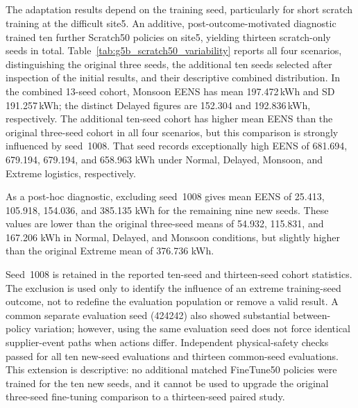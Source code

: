 \subsection[Transfer Variability and Scalability Limitations]
{}
\label{sec:g5b_scalability_limits}
\begin{revisedblock}
The adaptation results depend on the training seed, particularly for
short scratch training at the difficult site5. An additive,
post-outcome-motivated diagnostic trained ten further Scratch50
policies on site5, yielding thirteen scratch-only seeds in total.
Table~\ref{tab:g5b_scratch50_variability} reports all four
scenarios, distinguishing the original three seeds, the additional ten
seeds selected after inspection of the initial results, and their
descriptive combined distribution. In the combined 13-seed cohort, Monsoon EENS
has mean 197.472\,kWh and SD 191.257\,kWh; the distinct Delayed
figures are 152.304 and 192.836\,kWh, respectively. The additional ten-seed cohort has higher mean EENS
than the original three-seed cohort in all four
scenarios, but this comparison is strongly influenced
by seed~1008. That seed records exceptionally high
EENS of 681.694, 679.194, 679.194, and 658.963 kWh
under Normal, Delayed, Monsoon, and Extreme logistics,
respectively.

As a post-hoc diagnostic, excluding seed~1008 gives
mean EENS of 25.413, 105.918, 154.036, and
385.135 kWh for the remaining nine new seeds.
These values are lower than the original three-seed
means of 54.932, 115.831, and 167.206 kWh in
Normal, Delayed, and Monsoon conditions, but slightly
higher than the original Extreme mean of
376.736 kWh.

Seed~1008 is retained in the reported ten-seed
and thirteen-seed cohort statistics. The exclusion
is used only to identify the influence of an extreme
training-seed outcome, not to redefine the
evaluation population or remove a valid result. A common
separate evaluation seed (424242) also showed substantial
between-policy variation; however, using the same evaluation seed
does not force identical supplier-event paths when actions differ.
Independent physical-safety checks passed for all ten new-seed evaluations and thirteen common-seed evaluations. This extension is descriptive: no additional
matched FineTune50 policies were trained for the ten new seeds,
and it cannot be used to upgrade the original three-seed
fine-tuning comparison to a thirteen-seed paired study.
\end{revisedblock}

